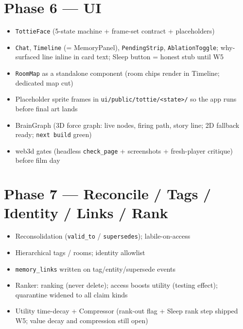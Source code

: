 \section{Phase 6 --- UI}
\begin{itemize}
  \item[$\boxtimes$] \texttt{TottieFace} (5-state machine + frame-set contract + placeholders)
  \item[$\boxtimes$] \texttt{Chat}, \texttt{Timeline} (= MemoryPanel), \texttt{PendingStrip}, \texttt{AblationToggle}; why-surfaced line inline in card text; Sleep button = honest stub until W5
  \item[$\square$] \texttt{RoomMap} as a standalone component (room chips render in Timeline; dedicated map cut)
  \item[$\boxtimes$] Placeholder sprite frames in \texttt{ui/public/tottie/<state>/} so the app runs before final art lands
  \item[$\boxtimes$] BrainGraph (3D force graph: live nodes, firing path, story line; 2D fallback ready; \texttt{next build} green)
  \item[$\square$] web3d gates (headless \texttt{check\_page} + screenshots + fresh-player critique) before film day
\end{itemize}

\section{Phase 7 --- Reconcile / Tags / Identity / Links / Rank}
\begin{itemize}
  \item[$\boxtimes$] Reconsolidation (\texttt{valid\_to} / \texttt{supersedes}); labile-on-access
  \item[$\boxtimes$] Hierarchical tags / rooms; identity allowlist
  \item[$\boxtimes$] \texttt{memory\_links} written on tag/entity/supersede events
  \item[$\boxtimes$] Ranker: ranking (never delete); access boosts utility (testing effect); quarantine widened to all claim kinds
  \item[$\square$] Utility time-decay + Compressor (rank-out flag + Sleep rank step shipped W5; value decay and compression still open)
\end{itemize}


